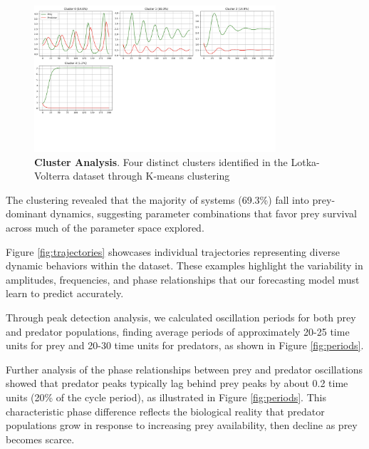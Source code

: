 \documentclass{article}
\begin{document}
\begin{figure}[H]
    \centering
    \includegraphics[width=0.8\textwidth]{cluster_representatives}
    \caption{\textbf{Cluster Analysis}. Four distinct clusters identified in the Lotka-Volterra dataset through K-means clustering}
    \label{fig:clusters}
\end{figure}

The clustering revealed that the majority of systems (69.3\%) fall into prey-dominant dynamics, suggesting parameter combinations that favor prey survival across much of the parameter space explored.

Figure \ref{fig:trajectories} showcases individual trajectories representing diverse dynamic behaviors within the dataset. These examples highlight the variability in amplitudes, frequencies, and phase relationships that our forecasting model must learn to predict accurately.

Through peak detection analysis, we calculated oscillation periods for both prey and predator populations, finding average periods of approximately 20-25 time units for prey and 20-30 time units for predators, as shown in Figure \ref{fig:periods}.

Further analysis of the phase relationships between prey and predator oscillations showed that predator peaks typically lag behind prey peaks by about 0.2 time units (20\% of the cycle period), as illustrated in Figure \ref{fig:periods}. This characteristic phase difference reflects the biological reality that predator populations grow in response to increasing prey availability, then decline as prey becomes scarce.
\end{document}
